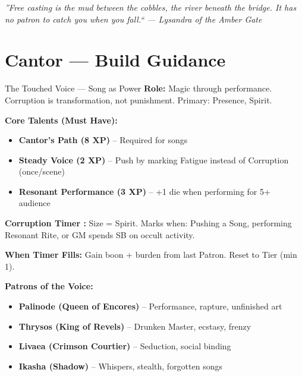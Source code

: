 \documentclass[10pt]{article}
\begin{document}
\vspace{0.5em}
\begin{center}
    {\small\sffamily\itshape ''Free casting is the mud between the cobbles, the river beneath the bridge. It has no patron to catch you when you fall.`` --- Lysandra of the Amber Gate}
\end{center}

\newpage


\section*{Cantor --- Build Guidance}

\begin{tipbox}{The Touched Voice --- Song as Power}
    \textbf{Role:} Magic through performance. Corruption is transformation, not punishment. Primary: Presence, Spirit.
    
    \textbf{Core Talents (Must Have):}
    \begin{itemize}
        \item \textbf{Cantor's Path (8 XP)} -- Required for songs
        \item \textbf{Steady Voice (2 XP)} -- Push by marking Fatigue instead of Corruption (once/scene)
        \item \textbf{Resonant Performance (3 XP)} -- +1 die when performing for 5+ audience
    \end{itemize}
    
    \textbf{Corruption Timer :} Size = Spirit. Marks when: Pushing a Song, performing Resonant Rite, or GM spends SB on occult activity.
    
    \textbf{When Timer Fills:} Gain boon + burden from last Patron. Reset to Tier (min 1).
    
    \textbf{Patrons of the Voice:}
    \begin{itemize}
        \item \textbf{Palinode (Queen of Encores)} -- Performance, rapture, unfinished art
        \item \textbf{Thrysos (King of Revels)} -- Drunken Master, ecstasy, frenzy
        \item \textbf{Livaea (Crimson Courtier)} -- Seduction, social binding
        \item \textbf{Ikasha (Shadow)} -- Whispers, stealth, forgotten songs
    \end{itemize}
\end{tipbox}
\end{document}
